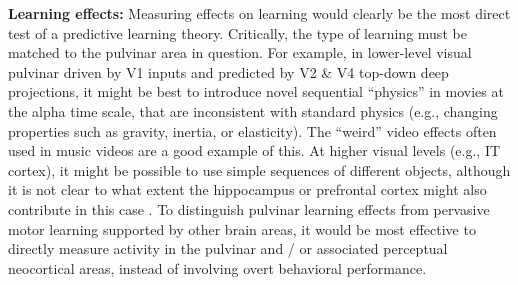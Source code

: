 \documentclass[11pt,twoside]{article}
\newif\myifpdf
\begin{document}
{\bf Learning effects:} Measuring effects on learning would clearly be the most direct test of a predictive learning theory.  Critically, the type of learning must be matched to the pulvinar area in question.  For example, in lower-level visual pulvinar driven by V1 inputs and predicted by V2 \& V4 top-down deep projections, it might be best to introduce novel sequential ``physics'' in movies at the alpha time scale, that are inconsistent with standard physics (e.g., changing properties such as gravity, inertia, or elasticity).  The ``weird'' video effects often used in music videos are a good example of this.  At higher visual levels (e.g., IT cortex), it might be possible to use simple sequences of different objects, although it is not clear to what extent the hippocampus or prefrontal cortex might also contribute in this case \cite{GavornikBear14,FiserMahringerOyiboEtAl16}.  To distinguish pulvinar learning effects from pervasive motor learning supported by other brain areas, it would be most effective to directly measure activity in the pulvinar and / or associated perceptual neocortical areas, instead of involving overt behavioral performance.
\end{document}
